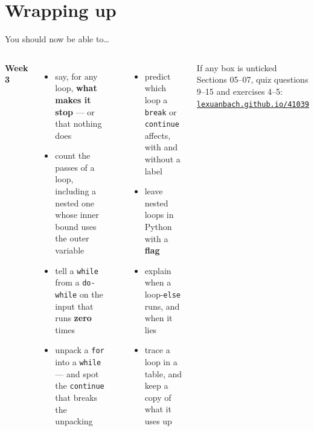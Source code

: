 \documentclass[aspectratio=169]{beamer}
\newcommand{\code}[1]{\texttt{#1}}
\newcommand{\srclink}[2]{\href{#1}{\texttt{#2}}}
\newcommand{\neutrallabel}[1]{\textcolor{bkblue}{\textbf{#1}}}
\newcommand{\yes}{\textcolor{goodgreen}{\ding{51}}}
\begin{document}
\section{Wrapping up}

\begin{frame}{You should now be able to\ldots}
  \begin{columns}[T,onlytextwidth]
    \neutrallabel{Week 3}
    \begin{itemize}[itemsep=0.2em]
      \small
      \item[\yes] say, for any loop, \textbf{what makes it stop} --- or that nothing does
      \item[\yes] count the passes of a loop, including a nested one whose inner bound uses
        the outer variable
      \item[\yes] tell a \code{while} from a \code{do-while} on the input that runs
        \textbf{zero} times
      \item[\yes] unpack a \code{for} into a \code{while} --- and spot the \code{continue}
        that breaks the unpacking
    \end{itemize}
    \neutrallabel{\phantom{Week 3}}
    \begin{itemize}[itemsep=0.2em]
      \small
      \item[\yes] predict which loop a \code{break} or \code{continue} affects, with and
        without a label
      \item[\yes] leave nested loops in Python with a \textbf{flag}
      \item[\yes] explain when a loop-\code{else} runs, and when it lies
      \item[\yes] trace a loop in a table, and keep a copy of what it uses up
    \end{itemize}
    \vspace{0.3em}
    \begin{contextbox}{If any box is unticked}
      \small Sections 05--07, quiz questions 9--15 and exercises 4--5:\\
      \srclink{https://lexuanbach.github.io/41039/weeks/week-2-3.html}{lexuanbach.github.io/41039}
    \end{contextbox}
  \end{columns}
\end{frame}
\end{document}

